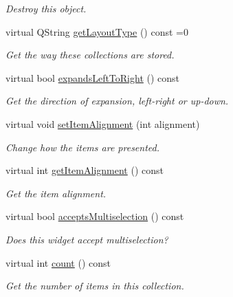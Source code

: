 \begin{DoxyCompactItemize}
\begin{DoxyCompactList}\small\item\em Destroy this object. \end{DoxyCompactList}\item 
virtual Q\-String \hyperlink{class_u_i_1_1_item_collection_widget_a476764a3844b34d2598ea246b4cca347}{get\-Layout\-Type} () const =0
\begin{DoxyCompactList}\small\item\em Get the way these collections are stored. \end{DoxyCompactList}\item 
virtual bool \hyperlink{class_u_i_1_1_item_collection_widget_ab7a43c61219c5d8f1c048ab07abcb21b}{expands\-Left\-To\-Right} () const 
\begin{DoxyCompactList}\small\item\em Get the direction of expansion, left-\/right or up-\/down. \end{DoxyCompactList}\item 
virtual void \hyperlink{class_u_i_1_1_item_collection_widget_a9e41bef277856cc79d4440f26d75fe8a}{set\-Item\-Alignment} (int alignment)
\begin{DoxyCompactList}\small\item\em Change how the items are presented. \end{DoxyCompactList}\item 
virtual int \hyperlink{class_u_i_1_1_item_collection_widget_a5637348b32526797c53426b4d978452e}{get\-Item\-Alignment} () const 
\begin{DoxyCompactList}\small\item\em Get the item alignment. \end{DoxyCompactList}\item 
virtual bool \hyperlink{class_u_i_1_1_item_collection_widget_a8db4ee532e89a0d9ffbee4f144667c50}{accepts\-Multiselection} () const 
\begin{DoxyCompactList}\small\item\em Does this widget accept multiselection? \end{DoxyCompactList}\item 
virtual int \hyperlink{class_u_i_1_1_item_collection_widget_adbb7eb876d6fed6a34583723fa9c58e3}{count} () const 
\begin{DoxyCompactList}\small\item\em Get the number of items in this collection. \end{DoxyCompactList}\end{DoxyCompactItemize}
